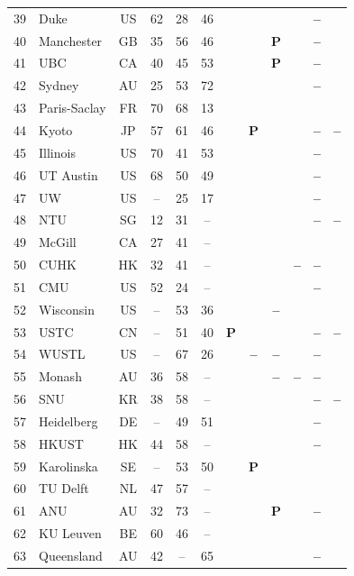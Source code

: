 \documentclass[pdflatex,sn-basic,Numbered]{sn-jnl}
\newcommand{\si}{\ding{51}}
\newcommand{\no}{\textcolor{gris}{\textbf{--}}}
\newcommand{\pc}{\textbf{P}}
\theoremstyle{thmstyleone}
\theoremstyle{thmstyletwo}
\theoremstyle{thmstylethree}
\begin{document}
\begin{appendices}
\begin{longtable}{@{}r l c c c c c c c c c c@{}}
	39 & Duke & US & 62 & 28 & 46 & \si & \si & \si & \si & \no & \si \\
	40 & Manchester & GB & 35 & 56 & 46 & \si & \si & \pc & \si & \no & \si \\
	41 & UBC & CA & 40 & 45 & 53 & \si & \si & \pc & \si & \no & \si \\
	42 & Sydney & AU & 25 & 53 & 72 & \si & \si & \si & \si & \no & \si \\
	43 & Paris-Saclay & FR & 70 & 68 & 13 & \si & \si & \si & \si & \si & \si \\
	44 & Kyoto & JP & 57 & 61 & 46 & \si & \pc & \si & \si & \no & \no \\
	45 & Illinois & US & 70 & 41 & 53 & \si & \si & \si & \si & \no & \si \\
	46 & UT Austin & US & 68 & 50 & 49 & \si & \si & \si & \si & \no & \si \\
	47 & UW & US & -- & 25 & 17 & \si & \si & \si & \si & \no & \si \\
	48 & NTU & SG & 12 & 31 & -- & \si & \si & \si & \si & \no & \no \\
	49 & McGill & CA & 27 & 41 & -- & \si & \si & \si & \si & \si & \si \\
	50 & CUHK & HK & 32 & 41 & -- & \si & \si & \si & \no & \no & \si \\
	51 & CMU & US & 52 & 24 & -- & \si & \si & \si & \si & \no & \si \\
	52 & Wisconsin & US & -- & 53 & 36 & \si & \si & \no & \si & \si & \si \\
	53 & USTC & CN & -- & 51 & 40 & \pc & \si & \si & \si & \no & \no \\
	54 & WUSTL & US & -- & 67 & 26 & \si & \no & \no & \si & \no & \si \\
	55 & Monash & AU & 36 & 58 & -- & \si & \si & \no & \no & \no & \si \\
	56 & SNU & KR & 38 & 58 & -- & \si & \si & \si & \si & \no & \no \\
	57 & Heidelberg & DE & -- & 49 & 51 & \si & \si & \si & \si & \no & \si \\
	58 & HKUST & HK & 44 & 58 & -- & \si & \si & \si & \si & \no & \si \\
	59 & Karolinska & SE & -- & 53 & 50 & \si & \pc & \si & \si & \si & \si \\
	60 & TU Delft & NL & 47 & 57 & -- & \si & \si & \si & \si & \si & \si \\
	61 & ANU & AU & 32 & 73 & -- & \si & \si & \pc & \si & \no & \si \\
	62 & KU Leuven & BE & 60 & 46 & -- & \si & \si & \si & \si & \si & \si \\
	63 & Queensland & AU & 42 & -- & 65 & \si & \si & \si & \si & \no & \si \\
\end{longtable}
\normalsize


\end{appendices}
\end{document}

